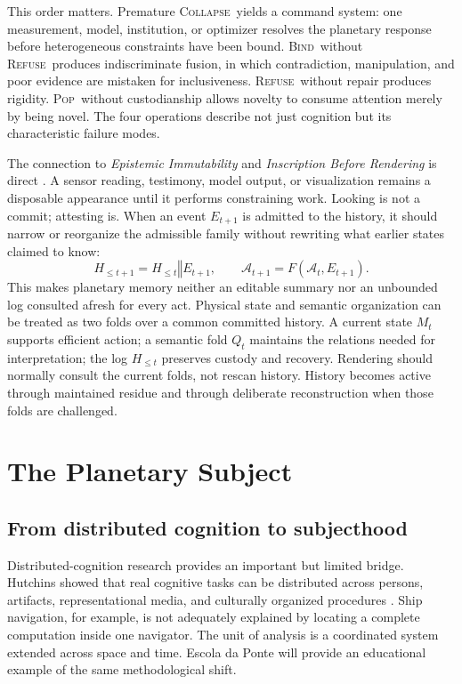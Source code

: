 \documentclass[11pt]{article}
\newcommand{\Pop}{\textsc{Pop}}
\newcommand{\Refuse}{\textsc{Refuse}}
\newcommand{\Bind}{\textsc{Bind}}
\newcommand{\Collapse}{\textsc{Collapse}}
\begin{document}
This order matters. Premature \Collapse\ yields a command system: one measurement, model, institution, or optimizer resolves the planetary response before heterogeneous constraints have been bound. \Bind\ without \Refuse\ produces indiscriminate fusion, in which contradiction, manipulation, and poor evidence are mistaken for inclusiveness. \Refuse\ without repair produces rigidity. \Pop\ without custodianship allows novelty to consume attention merely by being novel. The four operations describe not just cognition but its characteristic failure modes.

The connection to \emph{Epistemic Immutability} and \emph{Inscription Before Rendering} is direct \cite{flyxionEI,flyxionIR}. A sensor reading, testimony, model output, or visualization remains a disposable appearance until it performs constraining work. Looking is not a commit; attesting is. When an event $E_{t+1}$ is admitted to the history, it should narrow or reorganize the admissible family without rewriting what earlier states claimed to know:
\[
H_{\leq t+1}=H_{\leq t}\mathbin{\Vert}E_{t+1},
\qquad
\mathcal{A}_{t+1}=F(\mathcal{A}_t,E_{t+1}).
\]
This makes planetary memory neither an editable summary nor an unbounded log consulted afresh for every act. Physical state and semantic organization can be treated as two folds over a common committed history. A current state $M_t$ supports efficient action; a semantic fold $Q_t$ maintains the relations needed for interpretation; the log $H_{\leq t}$ preserves custody and recovery. Rendering should normally consult the current folds, not rescan history. History becomes active through maintained residue and through deliberate reconstruction when those folds are challenged.

\section{The Planetary Subject}

\subsection{From distributed cognition to subjecthood}

Distributed-cognition research provides an important but limited bridge. Hutchins showed that real cognitive tasks can be distributed across persons, artifacts, representational media, and culturally organized procedures \cite{hutchins1995,hutchins2001}. Ship navigation, for example, is not adequately explained by locating a complete computation inside one navigator. The unit of analysis is a coordinated system extended across space and time. Escola da Ponte will provide an educational example of the same methodological shift.
\end{document}
